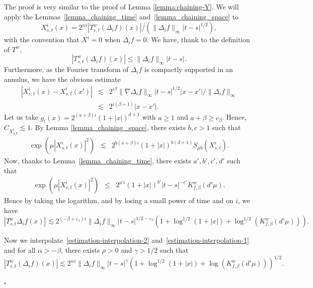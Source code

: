 \documentclass[a4paper,11pt]{article}
\newenvironment{proof}{{\sc Proof.}}{\hfill$\square$}
\begin{document}
\begin{proof}
  The proof is very similar to the proof of Lemma \ref{lemma:chaining-Y}. We
  will apply the Lemmas~\ref{lemma_chaining_time}
  and~\ref{lemma_chaining_space} to
  \[ X^{i}_{s,t} ( x ) =2^{i \alpha} | T^{w}_{s,t} ( \Delta_{i} f ) ( x ) | /
     ( \| \Delta_{i} f \|_{\infty} | t-s |^{1/2} ), \]
  with the convention that $X^{i} =0$ when $\Delta_{i} f=0$. We have, thank to
  the definition of $T^{w}$,
  \begin{equation}
    | T^{w}_{s,t} ( \Delta_{i} f ) ( x ) | \leqslant \| \Delta_{i} f
    \|_{\infty} | t-s |^{} \label{estimation-interpolation-1}.
  \end{equation}
  Furthermore, as the Fourier transform of $\Delta_{i} f$ is compactly
  supported in an annulus, we have the obvious estimate
  \begin{eqnarray*}
    | X^{i}_{s,t} ( x ) -X^{i}_{s,t} ( x' ) | & \lesssim & 2^{i \beta} \|
    \nabla \Delta_{i} f \|_{\infty} | t-s |^{1/2} | x-x' | / \| \Delta_{i} f
    \|_{\infty}\\
    & \lesssim & 2^{i ( \beta +1 )} | x-x' | .
  \end{eqnarray*}
  Let us take $g_{i} ( x ) =2^{( a+ \beta ) i} ( 1+ | x | )^{d+1}$ with $a
  \geqslant 1$ and $a+ \beta \geqslant c_{\beta}$. Hence, $C_{X^{i}_{s,t}}
  \lesssim 1$. By Lemma \ref{lemma_chaining_space}, there exists $b,c>1$ such
  that
  \begin{eqnarray*}
    \exp ( \mu | X^{i}_{s,t} ( x ) |^{2} ) & \lesssim & 2^{b  ( a+ \beta ) i}
    ( 1+ | x | )^{b ( d+1 )} S_{\mu b} ( X^{i}_{s,t} ) .
  \end{eqnarray*}
  Now, thanks to Lemma~\ref{lemma_chaining_time}, there exists $a' ,b' ,c'
  ,d'$ such that
  \begin{eqnarray*}
    \exp ( \mu | X^{i}_{s,t} ( x ) |^{2} ) & \leqslant & 2^{a' i} ( 1+ | x |
    )^{b'} | t-s |^{-c'} K^{w}_{f, \beta} ( d' \mu ) .
  \end{eqnarray*}
  Hence by taking the logarithm, and by losing a small power of time and on
  $i$, we have
  \begin{equation}
    | T^{w}_{s,t} \Delta_{i} f ( x ) |^{} \lesssim 2^{( - \beta +
    \varepsilon_{1} ) i} \| \Delta_{i} f \|_{\infty} | t-s |^{1/2-
    \varepsilon_{2}} ( 1+ \log^{1/2} ( 1+ | x | ) + \log^{1/2} ( K_{f,
    \beta}^{w} ( d' \mu ) ) ) \label{estimation-interpolation-2}.
  \end{equation}
  
  
  Now we interpolate~{\eqref{estimation-interpolation-2}}
  and~{\eqref{estimation-interpolation-1}} and for all $\alpha
  >- \beta$, there exists $\rho >0$ and $\gamma >1/2$ such that
  \[ | T^{w}_{s,t} ( \Delta_{i} f ) ( x ) | \lesssim 2 ^{\alpha i} \|
     \Delta_{i} f \|_{\infty} | t-s |^{\gamma} ( 1+ \log^{1/2} ( 1+ | x | ) +
     \log ( K_{f, \beta}^{w} ( d' \mu ) ) )^{1/2}.  \]
  
\end{proof}
\end{document}
